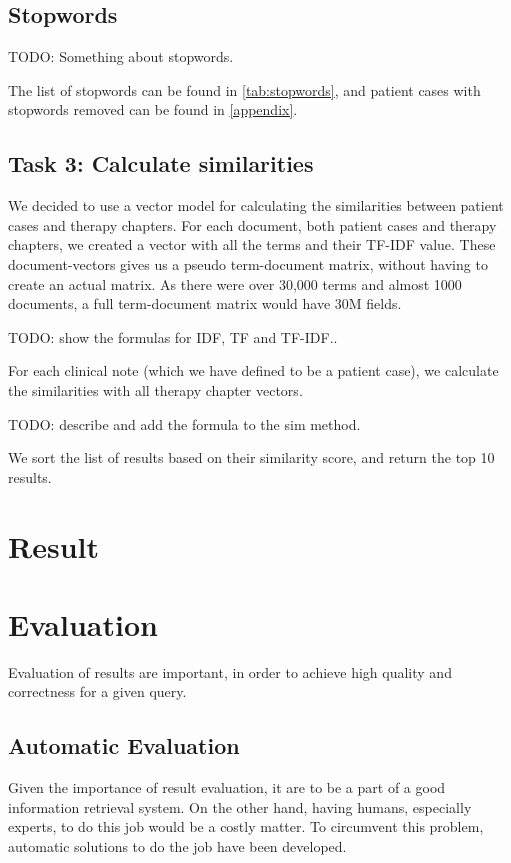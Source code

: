\documentclass[a4paper, 12pt]{article}
\begin{document}
\subsection{Stopwords}
TODO: Something about stopwords.

The list of stopwords can be found in \autoref{tab:stopwords},
and patient cases with stopwords removed can be found in \autoref{appendix}.

\subsection{Task 3: Calculate similarities}
We decided to use a vector model for calculating the similarities between
patient cases and therapy chapters. For each document, both patient cases
and therapy chapters, we created a vector with all the terms and their
TF-IDF value. These document-vectors gives us a pseudo term-document matrix,
without having to create an actual matrix. As there were over 30,000 terms
and almost 1000 documents, a full term-document matrix would have 30M fields.

TODO: show the formulas for IDF, TF and TF-IDF..

For each clinical note (which we have defined to be a patient case), we
calculate the similarities with all therapy chapter vectors.

TODO: describe and add the formula to the sim method.

We sort the list of results based on their similarity score, and return the
top 10 results.


\section{Result}
\label{sec:result}



\section{Evaluation}
\label{sec:evaluation}
Evaluation of results are important, in order to achieve high quality and correctness for a given query.

\subsection{Automatic Evaluation}
Given the importance of result evaluation, it are to be a part of a good information retrieval system. On the other hand, having humans, especially experts, to do this job would be a costly matter. To circumvent this problem, automatic solutions to do the job have been developed.
\end{document}
